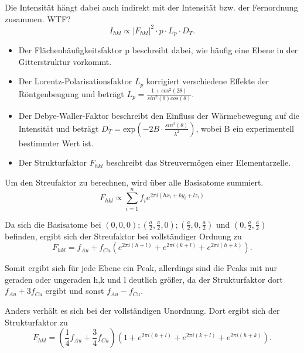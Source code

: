 \documentclass[
	a4paper,
	12pt,
	pagesize,
	ngerman
]{scrartcl}
\begin{document}
Die Intensität hängt dabei auch indirekt mit der Intensität bzw. der Fernordnung zusammen. \Huge WTF? \normalsize
\begin{equation}
I_{hkl} \propto |F_{hkl}|^{2} \cdot p \cdot L_{p} \cdot D_{T}.
\end{equation}

\begin{itemize}


\item Der Flächenhäufigkeitsfaktor p beschreibt dabei, wie häufig eine Ebene in der Gitterstruktur vorkommt.

\item Der Lorentz-Polarisationsfaktor $L_{p}$ korrigiert verschiedene Effekte der Röntgenbeugung und beträgt $L_{p} =\frac{1 + cos^{2}(2 \theta)}{sin^{2}(\theta) cos(\theta)}$. 

\item Der Debye-Waller-Faktor beschreibt den Einfluss der Wärmebewegung auf die Intensität und beträgt $D_{T} = \text{exp}(-2B \cdot \frac{sin^{2}(\theta)}{\lambda^{2}})$, wobei B ein experimentell bestimmter Wert ist.

\item Der Strukturfaktor $F_{hkl}$ beschreibt das Streuvermögen einer Elementarzelle.
\end{itemize}

Um den Streufaktor zu berechnen, wird über alle Basisatome summiert.
\begin{equation}
F_{hkl} \propto \sum_{i=1}^{n} f_{i} e^{2 \pi i(hx_{i} + ky_{i} + lz_{i})}
\end{equation}

Da sich die Basisatome bei $(0,0,0) ; (\frac{a}{2},\frac{a}{2},0) ; (\frac{a}{2},0,\frac{a}{2})$ und $(0, \frac{a}{2}, \frac{a}{2})$ befinden, ergibt sich der Streufaktor bei vollständiger Ordnung zu 
\begin{equation}
F_{hkl} = f_{Au} + f_{Cu} (e^{2 \pi i(h+l)} + e^{2 \pi i(k+l)} + e^{2 \pi i(h+k)}).
\end{equation}

Somit ergibt sich für jede Ebene ein Peak, allerdings sind die Peaks mit nur geraden oder ungeraden h,k und l deutlich größer, da der Strukturfaktor dort $f_{Au} + 3f_{Cu}$ ergibt und sonst $f_{Au} - f_{Cu}$.

Anders verhält es sich bei der vollständigen Unordnung. Dort ergibt sich der Strukturfaktor zu 
\begin{equation}
F_{hkl} = (\frac{1}{4} f_{Au} + \frac{3}{4}f_{Cu}) (1 + e^{2 \pi i(h+l)} + e^{2 \pi i(k+l)} + e^{2 \pi i(h+k)}).
\end{equation}
\end{document}
